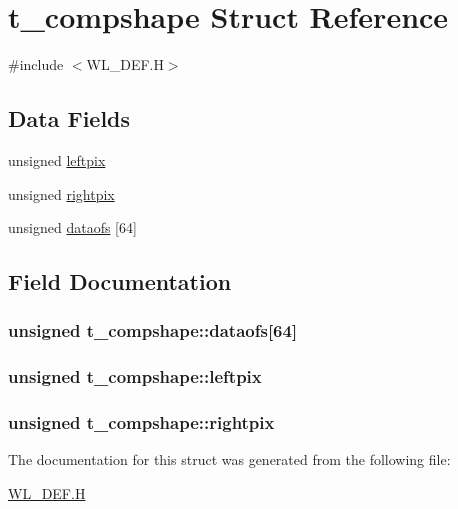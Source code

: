 \hypertarget{structt__compshape}{
\section{t\_\-compshape Struct Reference}
\label{structt__compshape}
}


{\ttfamily \#include $<$WL\_\-DEF.H$>$}

\subsection*{Data Fields}
\begin{DoxyCompactItemize}
\item 
unsigned \hyperlink{structt__compshape_af9d7aa697387641ffe5a8e3ab30f4910}{leftpix}
\item 
unsigned \hyperlink{structt__compshape_adc4d37ff9fb2cb8276dc3a1b412e4bac}{rightpix}
\item 
unsigned \hyperlink{structt__compshape_a527c7e3cbd00990982ed24903e527645}{dataofs} \mbox{[}64\mbox{]}
\end{DoxyCompactItemize}


\subsection{Field Documentation}
\hypertarget{structt__compshape_a527c7e3cbd00990982ed24903e527645}{
\subsubsection[{dataofs}]{\setlength{\rightskip}{0pt plus 5cm}unsigned {\bf t\_\-compshape::dataofs}\mbox{[}64\mbox{]}}}
\label{structt__compshape_a527c7e3cbd00990982ed24903e527645}
\hypertarget{structt__compshape_af9d7aa697387641ffe5a8e3ab30f4910}{
\subsubsection[{leftpix}]{\setlength{\rightskip}{0pt plus 5cm}unsigned {\bf t\_\-compshape::leftpix}}}
\label{structt__compshape_af9d7aa697387641ffe5a8e3ab30f4910}
\hypertarget{structt__compshape_adc4d37ff9fb2cb8276dc3a1b412e4bac}{
\subsubsection[{rightpix}]{\setlength{\rightskip}{0pt plus 5cm}unsigned {\bf t\_\-compshape::rightpix}}}
\label{structt__compshape_adc4d37ff9fb2cb8276dc3a1b412e4bac}


The documentation for this struct was generated from the following file:\begin{DoxyCompactItemize}
\item 
\hyperlink{WL__DEF_8H}{WL\_\-DEF.H}\end{DoxyCompactItemize}

